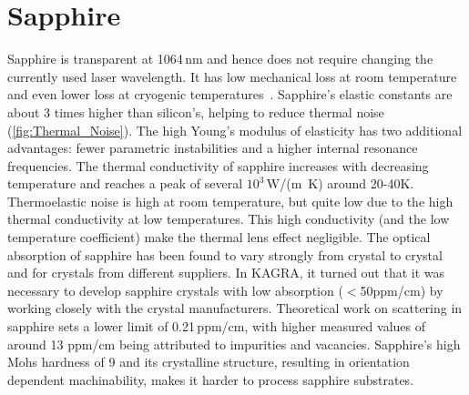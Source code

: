 \section{Sapphire}
Sapphire is transparent at 1064\,nm and hence does not require changing the currently used laser wavelength. It has low mechanical loss at room temperature~\cite{Rowan_2000a} and even lower loss at cryogenic temperatures~\cite{uchiyama1999mechanical}. 
Sapphire's elastic constants are about 3 times higher than silicon's, helping to reduce thermal noise (\ref{fig:Thermal_Noise}). The high Young's modulus of elasticity has two additional advantages: fewer parametric instabilities and a higher internal resonance frequencies. The thermal conductivity of sapphire increases with decreasing temperature and reaches a peak of several $10^3$\,W/(m \,K) around 20-40K. Thermoelastic noise is high at room temperature, but quite low due to the high thermal conductivity at low temperatures. This high conductivity (and the low temperature coefficient) make the thermal lens effect negligible. 
The optical absorption of sapphire has been found to vary strongly from crystal to crystal and for crystals from different suppliers. %
In KAGRA, it turned out that it was necessary to develop sapphire crystals with low absorption ($<$50ppm/cm) by working closely with the crystal manufacturers. 
Theoretical work on scattering in sapphire sets a lower limit of 0.21\,ppm/cm, with higher measured values of around 13 ppm/cm being attributed to impurities and vacancies.
Sapphire's high Mohs hardness of 9 and its crystalline structure, resulting in orientation dependent machinability, makes it harder to process sapphire substrates. 
